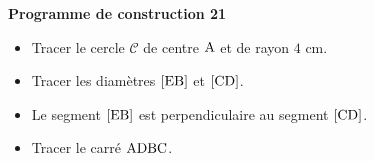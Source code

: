 \documentclass[exercice,a4]{thedocument}%
\begin{document}
%
\noindent\textbf{Programme de construction 21}\par\smallskip\noindent
\begin{itemize}
    \item Tracer le cercle $\mathcal{C}$ de centre $\text{A}$ et de
    rayon $4\text{ cm}$.
    \item Tracer les diamètres $[\text{EB}]$ et $[\text{CD}]$.
    \item Le segment $[\text{EB}]$ est perpendiculaire au segment
    $[\text{CD}]$.
    \item Tracer le carré $\text{ADBC}$.
\end{itemize}
\end{document}
